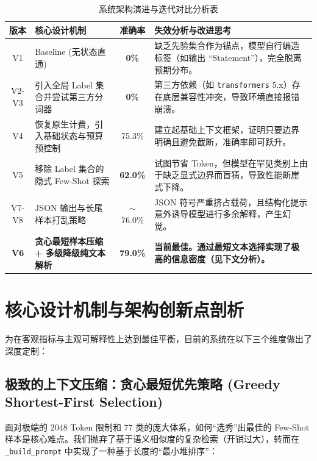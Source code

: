 \documentclass[11pt, a4paper]{ctexart}
\begin{document}
\begin{table}[hbtp]
\centering
\caption{系统架构演进与迭代对比分析表}
\vspace{0.5em}
\renewcommand{\arraystretch}{1.4}
\begin{tabularx}{\textwidth}{@{} 
  c 
  >{\raggedright\arraybackslash}X 
  c 
  >{\raggedright\arraybackslash}X 
@{}}
\toprule
\textbf{版本} & \textbf{核心设计机制} & \textbf{准确率} & \textbf{失效分析与改进思考} \\
\midrule
V1 & Baseline (无状态直通) & \textcolor{accent}{\textbf{0\%}} & 缺乏先验集合作为锚点，模型自行编造标签（如输出 ``Statement''），完全脱离预期分布。 \\
V2-V3 & 引入全局 Label 集合并尝试第三方分词器 & \textcolor{accent}{\textbf{0\%}} & 第三方依赖（如 \texttt{transformers} 5.x）存在底层兼容性冲突，导致环境直接报错崩溃。 \\
V4 & 恢复原生计费，引入基础状态与预算预控制 & 75.3\% & 建立起基础上下文框架，证明只要边界明确且避免截断，准确率即可跃升。 \\
V5 & 移除 Label 集合的隐式 Few-Shot 探索 & \textcolor{warning}{\textbf{62.0\%}} & 试图节省 Token，但模型在罕见类别上由于缺乏显式边界而盲猜，导致性能断崖式下降。 \\
V7-V8 & JSON 输出与长尾样本打乱策略 & $\sim$76.0\% & JSON 符号严重挤占载荷，且结构化提示意外诱导模型进行多余解释，产生幻觉。 \\
\midrule
\rowcolor{lightbg}
\textbf{V6} & \textbf{贪心最短样本压缩 + 多级降级纯文本解析} & \textcolor{success}{\textbf{79.0\%}} & \textbf{当前最佳。通过最短文本选择实现了极高的信息密度（见下文分析）。} \\
\bottomrule
\end{tabularx}
\end{table}

\section{核心设计机制与架构创新点剖析}

为在客观指标与主观可解释性上达到最佳平衡，目前的系统在以下三个维度做出了深度定制：

\subsection{极致的上下文压缩：贪心最短优先策略 (Greedy Shortest-First Selection)}

面对极端的 $2048$ Token 限制和 $77$ 类的庞大体系，如何“选秀”出最佳的 Few-Shot 样本是核心难点。我们抛弃了基于语义相似度的复杂检索（开销过大），转而在 \texttt{\_build\_prompt} 中实现了一种基于长度的“最小堆排序”：
\end{document}

